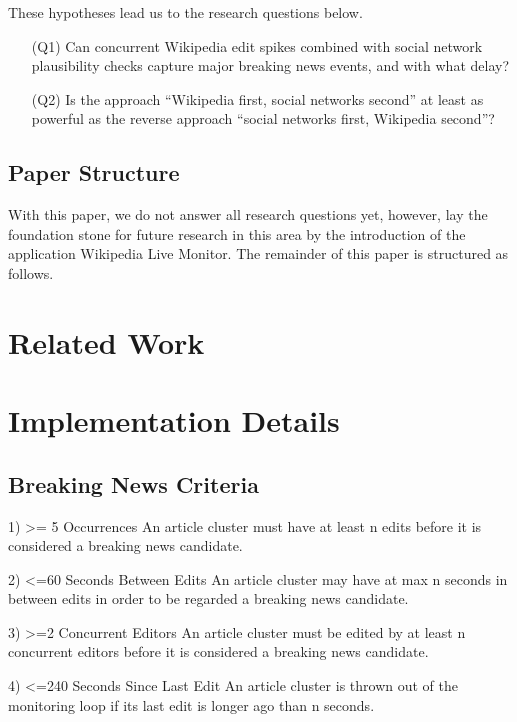 \documentclass{sig-alternate}
\begin{document}
These hypotheses lead us to the research questions below.

\begin{itemize}
  \item[(Q1)] Can concurrent Wikipedia edit spikes combined with
    social network plausibility checks capture major breaking news events,
    and with what delay?
  \item[(Q2)] Is the approach ``Wikipedia first, social networks second''
    at least as powerful as the reverse approach ``social networks first,
    Wikipedia second''?
\end{itemize}

\subsection{Paper Structure}
With this paper, we do not answer all research questions yet,
however, lay the foundation stone for future research in this area
by the introduction of the application Wikipedia Live Monitor.
The remainder of this paper is structured as follows.

\section{Related Work}

\cite{petrovic2010streamingfirststory}

\cite{osborne2012bieber}

\section{Implementation Details}

\subsection{Breaking News Criteria}

1) >= 5 Occurrences 
An article cluster must have at least n edits before it is considered a breaking news candidate.

2) <=60 Seconds Between Edits 
An article cluster may have at max n seconds in between edits in order to be regarded a breaking news candidate.

3) >=2 Concurrent Editors
An article cluster must be edited by at least n concurrent editors before it is considered a breaking news candidate.

4) <=240 Seconds Since Last Edit 
An article cluster is thrown out of the monitoring loop if its last edit is longer ago than n seconds.
\end{document}
